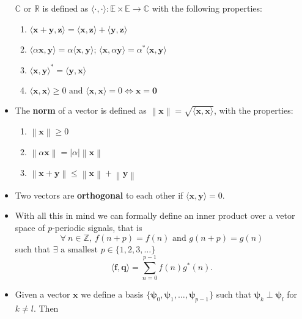 \begin{itemize}
	      $\mathbb{C}$ or $\mathbb{R}$ is defined as
	      $\langle \cdot, \cdot \rangle : \mathbb{E} \times \mathbb{E} \longrightarrow \mathbb{C}$
	      with the following properties:
	      \begin{enumerate}
		      \item $\langle \bm{x} + \bm{y}, \bm{z} \rangle = \langle \bm{x}, \bm{z} \rangle + \langle \bm{y}, \bm{z} \rangle$
		      \item $\langle \alpha\bm{x}, \bm{y} \rangle = \alpha\langle \bm{x},\bm{y} \rangle$;
		            $\langle \bm{x}, \alpha\bm{y} \rangle = \alpha^*\langle \bm{x},\bm{y} \rangle$
		      \item $\langle \bm{x},\bm{y} \rangle^* = \langle \bm{y}, \bm{x} \rangle$
		      \item $\langle \bm{x},\bm{x} \rangle \ge 0 \text{ and } \langle \bm{x},\bm{x} \rangle = 0 \iff \bm{x} = \bm{0}$
	      \end{enumerate}
	\item The \textbf{norm} of a vector is defined as
	      $\left\lVert \bm{x} \right\lVert = \sqrt{\langle \bm{x},\bm{x} \rangle}$,
	      with the properties:
	      \begin{enumerate}
		      \item $\left\lVert \bm{x} \right\rVert \ge 0$
		      \item $\left\lVert \alpha\bm{x} \right\rVert = \left| \alpha \right| \left\lVert \bm{x} \right\rVert$
		      \item $\left\lVert \bm{x} + \bm{y} \right\rVert \le \left\lVert \bm{x} \right\rVert + \left\lVert \bm{y} \right\rVert$
	      \end{enumerate}
	\item Two vectors are \textbf{orthogonal} to each other if
	      $\langle \bm{x},\bm{y} \rangle = 0$.
	\item With all this in mind we can formally define an inner product over
	      a vetor space of $p$-periodic signals, that is
	      \[
		      \forall\ n \in \mathbb{Z},\ f(n+p) = f(n) \text{ and } g(n+p) = g(n)
	      \]
	      such that $\exists \text{ a smallest } p \in \{1,2,3,\ldots\}$
	      \begin{equation}
		      \langle \bm{f}, \bm{q} \rangle = \sum_{n=0}^{p-1} f(n)g^*(n)
		      .\end{equation}
	\item Given a vector $\bm{x}$ we define a basis
	      $\{\bm{\psi}_{0}, \bm{\psi}_{1}, \ldots, \bm{\psi}_{p-1}\}$ such that
	      $\bm{\psi}_{k} \perp \bm{\psi}_{l}$ for $k \neq l$. Then

\end{itemize}
